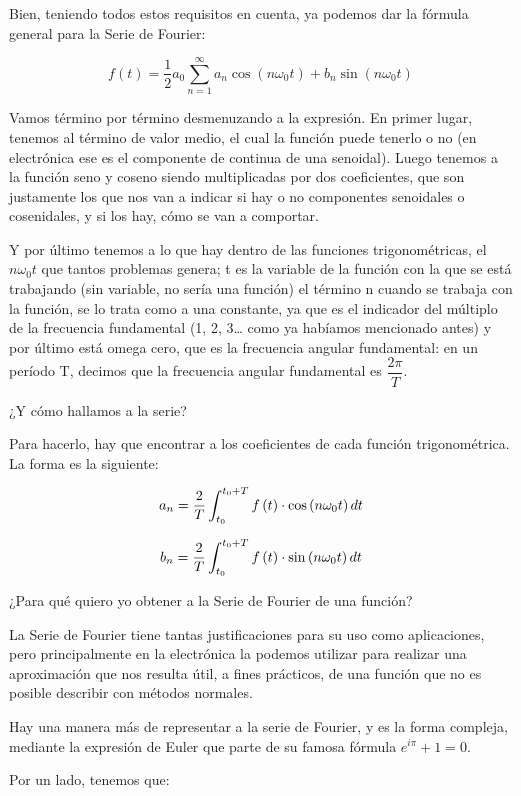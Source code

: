\documentclass[../main.tex]{subfiles}
\begin{document}
	Bien, teniendo todos estos requisitos en cuenta, ya podemos dar la
	fórmula general para la Serie de Fourier:

	\[f\left( t \right) = \dfrac{1}{2}a_{0}\sum_{n = 1}^{\infty}a_{n}\cos\left( n\omega_{0}t \right) 
	+ b_{n}\sin\left( n\omega_{0}t \right)\]

	Vamos término por término desmenuzando a la expresión. En primer lugar,
	tenemos al término de valor medio, el cual la función puede tenerlo o no
	(en electrónica ese es el componente de continua de una senoidal). Luego
	tenemos a la función seno y coseno siendo multiplicadas por dos
	coeficientes, que son justamente los que nos van a indicar si hay o no
	componentes senoidales o cosenidales, y si los hay, cómo se van a
	comportar.

	Y por último tenemos a lo que hay dentro de las funciones
	trigonométricas, el \(n\omega_{0}t\) que tantos problemas genera; t es
	la variable de la función con la que se está trabajando (sin variable,
	no sería una función) el término n cuando se trabaja con la función, se
	lo trata como a una constante, ya que es el indicador del múltiplo de la
	frecuencia fundamental (1, 2, 3\ldots{} como ya habíamos mencionado
	antes) y por último está omega cero, que es la frecuencia angular
	fundamental: en un período T, decimos que la frecuencia angular
	fundamental es \(\dfrac{2\pi}{T}\).

	¿Y cómo hallamos a la serie?

	Para hacerlo, hay que encontrar a los coeficientes de cada función
	trigonométrica. La forma es la siguiente:

	\[a_{n} = \dfrac{2}{T}\int_{t_{0}}^{t_{0} + T}{f\left( t \right)} \cdot
	\cos\left( n\omega_{0}t \right)dt\]

	\[b_{n} = \dfrac{2}{T}\int_{t_{0}}^{t_{0} + T}{f\left( t \right)} \cdot
	\sin\left( n\omega_{0}t \right)dt\]

	¿Para qué quiero yo obtener a la Serie de Fourier de una función?

	La Serie de Fourier tiene tantas justificaciones para su uso como
	aplicaciones, pero principalmente en la electrónica la podemos utilizar
	para realizar una aproximación que nos resulta útil, a fines prácticos,
	de una función que no es posible describir con métodos normales.

	Hay una manera más de representar a la serie de Fourier, y es la forma
	compleja, mediante la expresión de Euler que parte de su famosa fórmula
	\( e^{i\pi} + 1 = 0 \).

	Por un lado, tenemos que:
\end{document}
